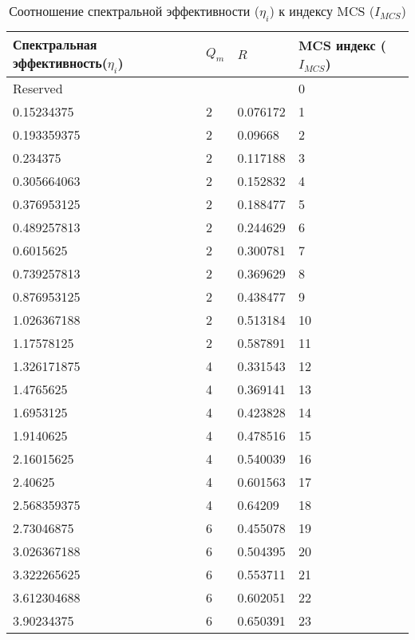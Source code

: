 \begin{table} [htb]
  \centering
\parbox{15cm}{\caption{Соотношение спектральной эффективности ($\eta_{i}$) к индексу MCS ($I_{MCS}$)}\label{MCS_spectr}}
\begin{tabular}{|l|l|l|l|}
 \hline
 \hline
Спектральная эффективность($\eta_{i}$) & $Q_{m}$ & $R$        & MCS индекс ($I_{MCS}$) \\ \hline \hline 
\multicolumn{3}{|l|}{Reserved}  & 0 \\  \hline
    0.15234375     & 2  & 0.076172 & 1       \\ \hline
    0.193359375    & 2  & 0.09668  & 2       \\ \hline
    0.234375       & 2  & 0.117188 & 3       \\ \hline
    0.305664063    & 2  & 0.152832 & 4       \\ \hline
    0.376953125    & 2  & 0.188477 & 5       \\ \hline
    0.489257813    & 2  & 0.244629 & 6       \\ \hline
    0.6015625      & 2  & 0.300781 & 7       \\ \hline
    0.739257813    & 2  & 0.369629 & 8       \\ \hline
    0.876953125    & 2  & 0.438477 & 9       \\ \hline
    1.026367188    & 2  & 0.513184 & 10      \\ \hline
    1.17578125     & 2  & 0.587891 & 11      \\ \hline
    1.326171875    & 4  & 0.331543 & 12      \\ \hline
    1.4765625      & 4  & 0.369141 & 13      \\ \hline
    1.6953125      & 4  & 0.423828 & 14      \\ \hline
    1.9140625      & 4  & 0.478516 & 15      \\ \hline
    2.16015625     & 4  & 0.540039 & 16      \\ \hline
    2.40625        & 4  & 0.601563 & 17      \\ \hline
    2.568359375    & 4  & 0.64209  & 18      \\ \hline
    2.73046875     & 6  & 0.455078 & 19      \\ \hline
    3.026367188    & 6  & 0.504395 & 20      \\ \hline
    3.322265625    & 6  & 0.553711 & 21      \\ \hline
    3.612304688    & 6  & 0.602051 & 22      \\ \hline
    3.90234375     & 6  & 0.650391 & 23      \\ \hline

\end{tabular}
\end{table}

